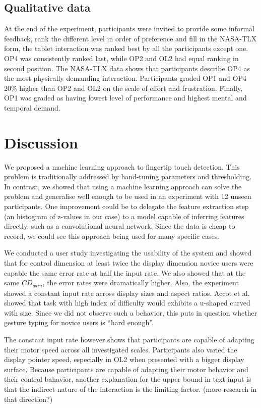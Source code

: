 \documentclass{chi-ext}
\newcommand{\cdt}[1]{{\small\uppercase{{#1}}}}
\begin{document}
\subsection{Qualitative data}
At the end of the experiment, participants were invited to provide some informal feedback, rank the different level in order of preference and fill in the NASA-TLX form, the tablet interaction was ranked best by all the participants except one. \cdt{OP4} was consistently ranked last, while \cdt{OP2} and \cdt{OL2} had equal ranking in second position. The NASA-TLX data shows that participants describe \cdt{OP4} as the most physically demanding interaction. Participants graded \cdt{OP1} and \cdt{OP4} 20\% higher than \cdt{OP2} and \cdt{OL2} on the scale of effort and frustration. Finally, \cdt{OP1} was graded as having lowest level of performance and highest mental and temporal demand.

\section{Discussion}

We proposed a machine learning approach to fingertip touch detection. This problem is traditionally addressed by hand-tuning parameters and thresholding. In contrast, we showed that using a machine learning approach can solve the problem and generalise well enough to be used in an experiment with 12 unseen participants. One improvement could be to delegate the feature extraction step (an histogram of z-values in our case) to a model capable of inferring features directly, such as a convolutional neural network. Since the data is cheap to record, we could see this approach being used for many specific cases.

We conducted a user study investigating the usability of the system and showed that for control dimension at least twice the display dimension novice users were capable the same error rate at half the input rate. We also showed that at the same $CD_{gain}$, the error rates were dramatically higher. Also, the experiment showed a constant input rate across display sizes and aspect ratios. Accot et al.~\cite{Accot2001} showed that task with high index of difficulty would exhibits a u-shaped curved with size. Since we did not observe such a behavior, this puts in question whether gesture typing for novice users is “hard enough”.

The constant input rate however shows that participants are capable of adapting their motor speed across all investigated scales. Participants also varied the display pointer speed, especially in \cdt{OL2} when presented with a bigger display surface. Because participants are capable of adapting their motor behavior and their control bahavior, another explanation for the upper bound in text input is that the indirect nature of the interaction is the limiting factor. (more research in that direction?)
\end{document}
